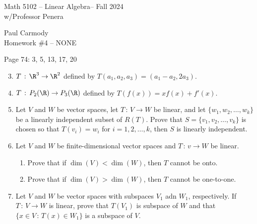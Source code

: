 \documentclass[10pt,a4paper]{report}
\newcommand{\CLASSNAME}{Math 5102 -- Linear Algebra}
\newcommand{\STUDENTNAME}{Paul Carmody}
\newcommand{\ASSIGNMENT}{Homework \#4 }
\newcommand{\DUEDATE}{NONE}
\newcommand{\SEMESTER}{Fall 2024}
\begin{document}
\begin{center}
	\Large{\CLASSNAME -- \SEMESTER} \\
	\large{ w/Professor Penera}
\end{center}
\begin{center}
	\STUDENTNAME \\
	\ASSIGNMENT -- \DUEDATE\\
\end{center} 
Page 74: 3, 5, 13, 17, 20
\begin{enumerate}
	\setcounter{enumi}{2}
	\item $T\,:\, \R^3 \to \R^2$ defined by $T(a_1,a_2,a_3) = (a_1-a_2, 2a_3)$.
	\setcounter{enumi}{4}
	\item $T\,:\, P_2(\R)\to P_3(\R)$ defined by $T(f(x)) = xf(x)+f'(x)$.
	\setcounter{enumi}{12}
	\item Let $V$ and $W$ be vector spaces, let $T\,:\,V\to W$ be linear, and let $\{w_1,w_2, \dots, w_k\}$ be a linearly independent subset of $R(T)$.  Prove that $S=\{v_1,v_2,\dots, v_k\}$ is chosen so that $T(v_i)=w_i$ for $i =1,2,\dots,k$, then $S$ is linearly independent.
	\setcounter{enumi}{16}
	\item Let $V$ and $W$ be finite-dimensional vector spaces and $T\,:\, v \to W$ be linear.
	\begin{enumerate}
		\item Prove that if $\dim(V) < \dim(W)$, then $T$ cannot be onto.
		\item Prove that if $\dim(V) >\dim(W)$, then $T$ cannot be one-to-one.
	\end{enumerate}
	\setcounter{enumi}{19}
	\item Let $V$ and $W$ be vector spaces with subspaces $V_1$ adn $W_1$, respectively.  If $T\,:\,V\to W$ is linear, prove that $T(V_1)$ is subspace of $W$ and that $\{x \in V\,:\, T(x) \in W_1\}$ is a subspace of $V$.
\end{enumerate}
\end{document}
